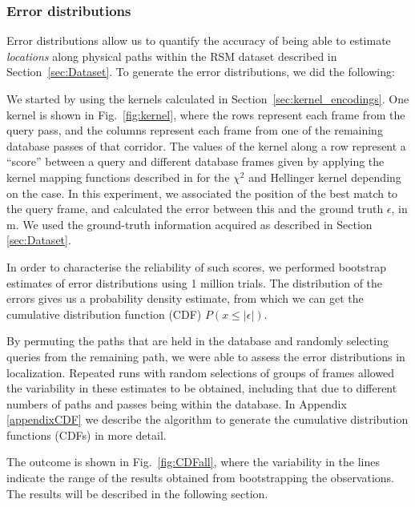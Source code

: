 \subsubsection{Error distributions}
\label{sec:CDFs}
Error distributions allow us to quantify the accuracy of being able to estimate {\em locations} along physical paths within the RSM dataset described in Section~\ref{sec:Dataset}. To generate the error distributions, we did the following: 

We started by using the kernels calculated in Section~\ref{sec:kernel_encodings}. One kernel is shown in Fig.~\ref{fig:kernel}, where the rows represent each frame from the query pass, and the columns represent each frame from one of the remaining database passes of that corridor. The values of the kernel along a row represent a ``score'' between a query and different database frames given by applying the kernel mapping functions described in \citep{Vedaldi2012} for the $\chi^2$ and Hellinger kernel depending on the case. In this experiment, we associated the position of the best match to the query frame, and calculated the error between this and the ground truth $\epsilon$, in m. We used the ground-truth information acquired as described in Section \ref{sec:Dataset}. 

In order to characterise the reliability of such scores, we performed bootstrap estimates of error distributions using 1 million trials. The distribution of the errors gives us a probability density estimate, from which we can get the cumulative distribution function (CDF) $P(x \leq |\epsilon|)$. 

By permuting the paths that are held in the database and randomly selecting queries from the remaining path, we were able to assess the error distributions in localization.  Repeated runs with random selections of groups of frames allowed the variability in these estimates to be obtained, including that due to different numbers of paths and passes being within the database. In Appendix \ref{appendixCDF} we describe the algorithm to generate the cumulative distribution functions (CDFs) in more detail. 

The outcome is shown in Fig.~\ref{fig:CDFall}, where the variability in the lines indicate the range of the results obtained from bootstrapping the observations. The results will be described in the following section.

